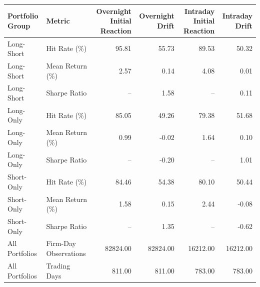 \begin{tabular}{llrrrr}
\toprule
Portfolio Group &                Metric & Overnight Initial Reaction &  Overnight Drift & Intraday Initial Reaction &  Intraday Drift \\
\midrule
     Long-Short &          Hit Rate (\%) &                      95.81 &            55.73 &                     89.53 &           50.32 \\
     Long-Short &       Mean Return (\%) &                       2.57 &             0.14 &                      4.08 &            0.01 \\
     Long-Short &          Sharpe Ratio &                         -- &             1.58 &                        -- &            0.11 \\
      Long-Only &          Hit Rate (\%) &                      85.05 &            49.26 &                     79.38 &           51.68 \\
      Long-Only &       Mean Return (\%) &                       0.99 &            -0.02 &                      1.64 &            0.10 \\
      Long-Only &          Sharpe Ratio &                         -- &            -0.20 &                        -- &            1.01 \\
     Short-Only &          Hit Rate (\%) &                      84.46 &            54.38 &                     80.10 &           50.44 \\
     Short-Only &       Mean Return (\%) &                       1.58 &             0.15 &                      2.44 &           -0.08 \\
     Short-Only &          Sharpe Ratio &                         -- &             1.35 &                        -- &           -0.62 \\
 All Portfolios & Firm-Day Observations &                   82824.00 &         82824.00 &                  16212.00 &        16212.00 \\
 All Portfolios &          Trading Days &                     811.00 &           811.00 &                    783.00 &          783.00 \\
\bottomrule
\end{tabular}

